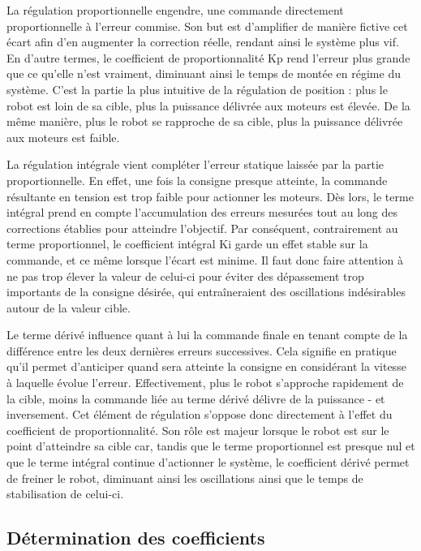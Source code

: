 \documentclass[a4paper,11pt]{article}
\begin{document}
La régulation proportionnelle engendre, une commande directement proportionnelle à l'erreur commise. Son but est d'amplifier de manière fictive cet écart afin d'en augmenter la correction réelle, rendant ainsi le système plus vif. En d'autre termes, le coefficient de proportionnalité Kp rend l'erreur plus grande que ce qu'elle n'est vraiment, diminuant ainsi le temps de montée en régime du système. C'est la partie la plus intuitive de la régulation de position : plus le robot est loin de sa cible, plus la puissance délivrée aux moteurs est élevée. De la même manière, plus le robot se rapproche de sa cible, plus la puissance délivrée aux moteurs est faible.

La régulation intégrale vient compléter l'erreur statique laissée par la partie proportionnelle. En effet, une fois la consigne presque atteinte, la commande résultante en tension est trop faible pour actionner les moteurs. Dès lors, le terme intégral prend en compte l'accumulation des erreurs mesurées tout au long des corrections établies pour atteindre l'objectif. Par conséquent, contrairement au terme proportionnel, le coefficient intégral Ki garde un effet stable sur la commande, et ce même lorsque l'écart est minime. Il faut donc faire attention à ne pas trop élever la valeur de celui-ci pour éviter des dépassement trop importants de la consigne désirée, qui entraîneraient des oscillations indésirables autour de la valeur cible.

Le terme dérivé influence quant à lui la commande finale en tenant compte de la différence entre les deux dernières erreurs successives. Cela signifie en pratique qu'il permet d'anticiper quand sera atteinte la consigne en considérant la vitesse à laquelle évolue l'erreur. Effectivement, plus le robot s'approche rapidement de la cible, moins la commande liée au terme dérivé délivre de la puissance - et inversement. Cet élément de régulation s'oppose donc directement à l'effet du coefficient de proportionnalité. Son rôle est majeur lorsque le robot est sur le point d'atteindre sa cible car, tandis que le terme proportionnel est presque nul et que le terme intégral continue d'actionner le système, le coefficient dérivé permet de freiner le robot, diminuant ainsi les oscillations ainsi que le temps de stabilisation de celui-ci.

\subsection{Détermination des coefficients \cite{le_lann_pid_2007}}
\end{document}
